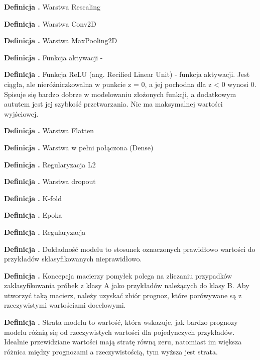 \noindent
\textbf{Definicja \mlDefinitionIndex.}
\incrementMlDefinitionIndex
Warstwa Rescaling

\noindent
\textbf{Definicja \mlDefinitionIndex.}
\incrementMlDefinitionIndex
Warstwa Conv2D

\noindent
\textbf{Definicja \mlDefinitionIndex.}
\incrementMlDefinitionIndex
Warstwa MaxPooling2D

\noindent
\textbf{Definicja \mlDefinitionIndex.}
\incrementMlDefinitionIndex
Funkcja aktywacji - 

\noindent
\textbf{Definicja \mlDefinitionIndex.}
\incrementMlDefinitionIndex
Funkcja ReLU (ang. Recified Linear Unit) - funkcja aktywacji.
Jest ciągła, ale nieróżniczkowalna w punkcie z = 0, a jej pochodna dla z < 0 wynosi 0.
Spisuje się bardzo dobrze w modelowaniu złożonych funkcji, a dodatkowym aututem jest jej szybkość przetwarzania.
Nie ma maksymalnej wartości wyjściowej.

\noindent
\textbf{Definicja \mlDefinitionIndex.}
\incrementMlDefinitionIndex
Warstwa Flatten

\noindent
\textbf{Definicja \mlDefinitionIndex.}
\incrementMlDefinitionIndex
Warstwa w pełni połączona (Dense)

\noindent
\textbf{Definicja \mlDefinitionIndex.}
\incrementMlDefinitionIndex
Regularyzacja L2

\noindent
\textbf{Definicja \mlDefinitionIndex.}
\incrementMlDefinitionIndex
Warstwa dropout

\noindent
\textbf{Definicja \mlDefinitionIndex.}
\incrementMlDefinitionIndex
K-fold

\noindent
\textbf{Definicja \mlDefinitionIndex.}
\incrementMlDefinitionIndex
Epoka

\noindent
\textbf{Definicja \mlDefinitionIndex.}
\incrementMlDefinitionIndex
Regularyzacja

\noindent
\textbf{Definicja \mlDefinitionIndex.}
\incrementMlDefinitionIndex
Dokładność modelu to stosunek oznaczonych prawidłowo wartości do przykładów sklasyfikowanych nieprawidłowo.

\noindent
\textbf{Definicja \mlDefinitionIndex.}
\incrementMlDefinitionIndex
Koncepcja macierzy pomyłek polega na zliczaniu przypadków zaklasyfikowania próbek z klasy A jako przykładów należących do klasy B.
Aby utworzyć taką macierz, należy uzyskać zbiór prognoz, które porówywane są z rzeczywistymi wartościami docelowymi.

\noindent
\textbf{Definicja \mlDefinitionIndex.}
\incrementMlDefinitionIndex
Strata modelu to wartość, która wskazuje,
jak bardzo prognozy modelu różnią się od rzeczywistych wartości dla pojedynczych przykładów.
Idealnie przewidziane wartości mają stratę równą zeru,
natomiast im większa różnica między prognozami a rzeczywistością, tym wyższa jest strata.

